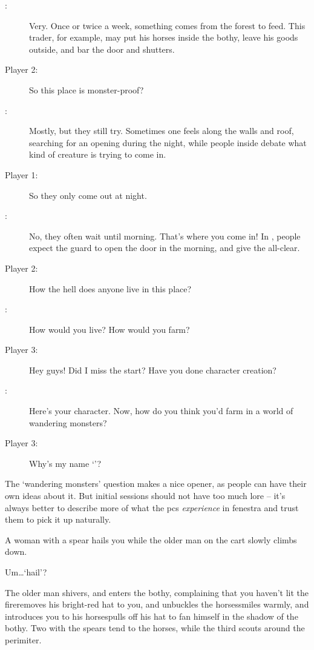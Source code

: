 \begin{multicols}{2}
\begin{description}
  \item[:]
  Very.
  Once or twice a week, something comes from the forest to feed.
  This trader, for example, may put his horses inside the \gls{bothy}, leave his goods outside, and bar the door and shutters.
  \item[Player 2:]
  So this place is \gls{monster}-proof?
  \item[:]
  Mostly, but they still try.
  Sometimes one feels along the walls and roof, searching for an opening during the night, while people inside debate what kind of creature is trying to come in.
  \item[Player 1:]
  So they only come out at night.
  \item[:]
  No, they often wait until morning.
  That's where you come in!
  In , people expect the \gls{guard} to open the door in the morning, and give the all-clear.
  \item[Player 2:]
  How the hell does anyone live in this place?
  \item[:]
  How would you live?
  How would you farm?
  \item[Player 3:]
  Hey guys!
  Did I miss the start?
  Have you done character creation?
  \item[:]
  Here's your character.
  Now, how do you think you'd farm in a world of wandering monsters?
  \item[Player 3:]
  Why's my name `\composeHumanName'?
\end{description}

\bigLine
\vspace{2em}

\noindent
The `wandering monsters' question makes a nice opener, as people can have their own ideas about it.
But initial sessions should not have too much lore -- it's always better to describe more of what the \glspl{pc} \emph{experience} in \gls{fenestra} and trust them to pick it up naturally.

\bigLine

\begin{description}\sf
  \item[\Glsentrytext{gm}:]
  A woman with a spear hails you while the older man on the cart slowly climbs down.
  \item[Player 3:]
  Um\ldots `hail'?
  \item[\Glsentrytext{gm}:]
  The older man \ifcase\value{temperature} shivers, and enters the \gls{bothy}, complaining that you haven't lit the fire\or removes his bright-red hat to you, and unbuckles the horses\or smiles warmly, and introduces you to his horses\else pulls off his hat to fan himself in the shadow of the \gls{bothy}\fi.
  Two with the spears tend to the horses, while the third scouts around the perimiter.
\end{description}


\end{multicols}
